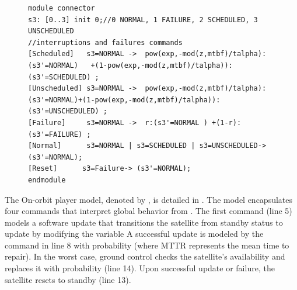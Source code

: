 \begin{figure}[!htb]            
\begin{minipage}{9cm}
\begin{lstlisting}[style=framed,%customc,
	caption=Satellite Environmental Failure Model ,
 	label=CSGSatteliteModel]	
module connector
s3: [0..3] init 0;//0 NORMAL, 1 FAILURE, 2 SCHEDULED, 3 UNSCHEDULED
//interruptions and failures commands
[Scheduled]   s3=NORMAL ->  pow(exp,-mod(z,mtbf)/talpha):(s3'=NORMAL)	+(1-pow(exp,-mod(z,mtbf)/talpha)):(s3'=SCHEDULED) ;
[Unscheduled] s3=NORMAL ->  pow(exp,-mod(z,mtbf)/talpha):(s3'=NORMAL)+(1-pow(exp,-mod(z,mtbf)/talpha)):(s3'=UNSCHEDULED) ;
[Failure]     s3=NORMAL ->  r:(s3'=NORMAL )	+(1-r):(s3'=FAILURE) ;
[Normal]      s3=NORMAL | s3=SCHEDULED | s3=UNSCHEDULED-> (s3'=NORMAL);
[Reset]      s3=Failure-> (s3'=NORMAL);
endmodule
\end{lstlisting}
 \end{minipage}  
\end{figure}

The On-orbit player model, denoted by , is detailed in . The model encapsulates four commands that interpret global behavior from . The first command (line 5) models a software update that transitions the satellite from standby status to update by modifying the variable A successful update is modeled by the command in line 8 with probability  (where MTTR represents the mean time to repair). In the worst case, ground control checks the satellite's availability and replaces it with probability  (line 14). Upon successful update or failure, the satellite resets to standby (line 13).
  


